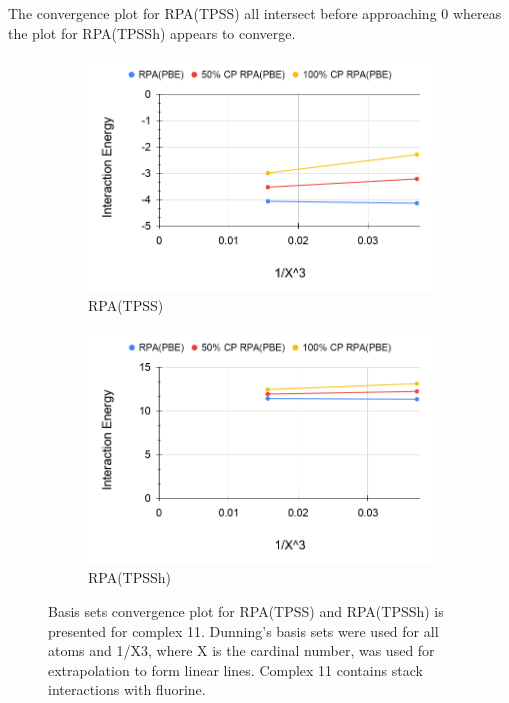 \documentclass[11pt]{article}
\begin{document}
The convergence plot for RPA(TPSS) all intersect before approaching 0
whereas the plot for RPA(TPSSh) appears to converge. 


\begin{figure}[H]
  \centering
  \begin{subfigure}{.5\textwidth}
    \centering
    \includegraphics[scale=0.3]{tpss-11.png}
    \caption{RPA(TPSS)}
    \label{fig:tpss11}
  \end{subfigure}%
  \begin{subfigure}{.5\textwidth}
    \centering
    \includegraphics[scale=0.3]{tpssh-11.png}
    \caption{RPA(TPSSh)}
    \label{fig:tpssh_11}
  \end{subfigure}
  \caption{Basis sets convergence plot for RPA(TPSS) and RPA(TPSSh) is
    presented for complex 11. Dunning's basis sets were used for all
    atoms and 1/X3, where X is the cardinal number, was used for
    extrapolation to form linear lines. Complex 11 contains stack
    interactions with fluorine.}
  \label{fig:complex_11}
\end{figure}
\end{document}
